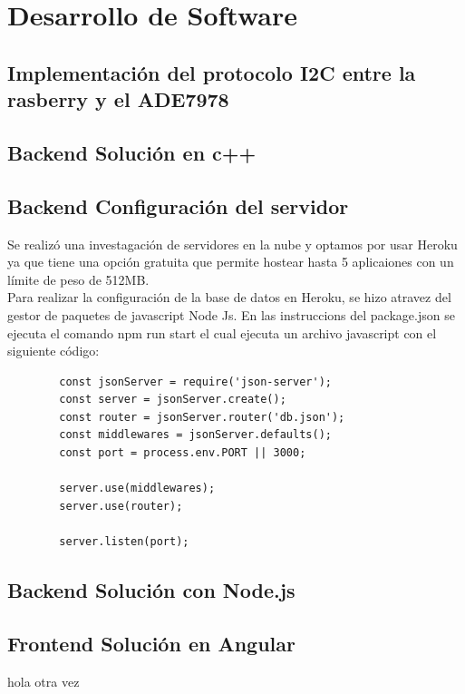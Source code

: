     \section{Desarrollo de Software}

    \subsection{Implementación del protocolo I2C entre la rasberry y el ADE7978}

    \subsection{Backend Solución en c++}
    \subsection{Backend Configuración del servidor}

    Se realizó una investagación de servidores en la nube y optamos por usar Heroku ya que tiene una opción gratuita que permite hostear hasta 5 aplicaiones con un límite de peso de 512MB. \\
    
    Para realizar la configuración de la base de datos en Heroku, se hizo atravez del gestor de paquetes de javascript Node Js. En las instruccions del package.json se ejecuta el comando npm run start el cual ejecuta un archivo javascript con el siguiente código:\\

    \begin{lstlisting}
        const jsonServer = require('json-server');
        const server = jsonServer.create();
        const router = jsonServer.router('db.json');
        const middlewares = jsonServer.defaults();
        const port = process.env.PORT || 3000;

        server.use(middlewares);
        server.use(router);

        server.listen(port);
        \end{lstlisting}
    \subsection{Backend Solución con Node.js}

    \subsection{Frontend Solución en Angular}
    hola otra vez